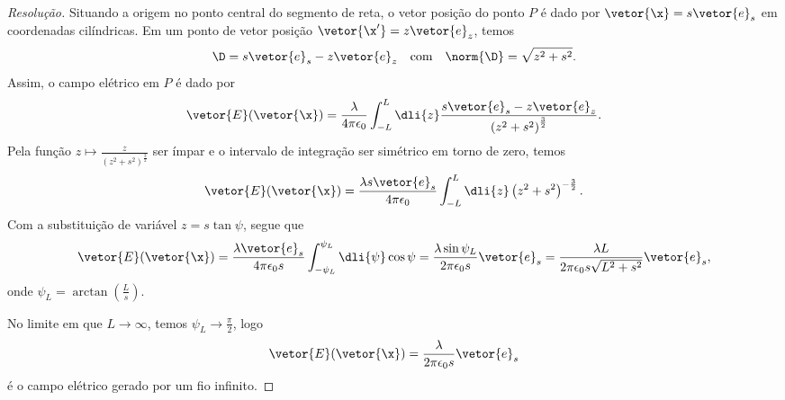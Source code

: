 \begin{proof}[Resolução]
    Situando a origem no ponto central do segmento de reta, o vetor posição do ponto \(P\) é dado por \(\vetor{\x} = s\vetor{e}_s\) em coordenadas cilíndricas. Em um ponto de vetor posição \(\vetor{\x'} = z\vetor{e}_z\), temos
    \begin{equation*}
        \D = s\vetor{e}_s - z\vetor{e}_z
        \quad\text{com}\quad
        \norm{\D} = \sqrt{z^2 + s^2}.
    \end{equation*}
    Assim, o campo elétrico em \(P\) é dado por
    \begin{equation*}
        \vetor{E}(\vetor{\x}) = \frac{\lambda}{4\pi \epsilon_0} \int_{-L}^L \dli{z} \frac{s \vetor{e}_s - z\vetor{e}_z}{\left(z^2 + s^2\right)^{\frac32}}.
    \end{equation*}
    Pela função \(z \mapsto \frac{z}{\left(z^2 + s^2\right)^{\frac32}}\) ser ímpar e o intervalo de integração ser simétrico em torno de zero, temos
    \begin{equation*}
        \vetor{E}(\vetor{\x}) = \frac{\lambda s\vetor{e}_s}{4\pi \epsilon_0} \int_{-L}^L\dli{z} \left(z^2 + s^2\right)^{-\frac32}.
    \end{equation*}
    Com a substituição de variável \(z = s \tan \psi\), segue que
    \begin{equation*}
        \vetor{E}(\vetor{\x}) = \frac{\lambda \vetor{e}_s}{4\pi \epsilon_0s} \int_{-\psi_L}^{\psi_L}\dli{\psi} \cos\psi = \frac{\lambda \sin\psi_L}{2\pi \epsilon_0 s}\vetor{e}_s = \frac{\lambda L}{2\pi \epsilon_0 s\sqrt{L^2 + s^2}}\vetor{e}_s,
    \end{equation*}
    onde \(\psi_L = \arctan\left(\frac{L}{s}\right)\).

    No limite em que \(L \to \infty\), temos \(\psi_L \to \frac{\pi}{2}\), logo
    \begin{equation*}
        \vetor{E}(\vetor{\x}) = \frac{\lambda}{2\pi \epsilon_0 s} \vetor{e}_s
    \end{equation*}
    é o campo elétrico gerado por um fio infinito.
\end{proof}
